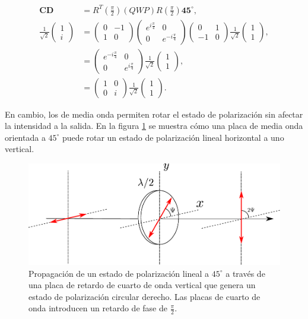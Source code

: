 \begin{align*}
\mathbf{CD} &=
R^{T}\left(\frac{\pi}{2}\right)\left(QWP\right)R\left(\frac{\pi}{2}\right)\mathbf{45}^{\circ},\\ 
  \frac{1}{\sqrt{2}}
\begin{pmatrix}
1\\i
\end{pmatrix}&=
\begin{pmatrix}
  0 &-1\\1&0
\end{pmatrix}
\begin{pmatrix} e^{i\frac{\pi}{4}}  &0\\0&e^{-i\frac{\pi}{4}} \end{pmatrix}
\begin{pmatrix}
  0&1\\-1&0
\end{pmatrix}
 \frac{1}{\sqrt{2}}
\begin{pmatrix}
1\\ 1
\end{pmatrix},
\\
&=
\begin{pmatrix}
e^{-i\frac{\pi}{4}}  & 0 \\0 & e^{i\frac{\pi}{4}} 
\end{pmatrix}
  \frac{1}{\sqrt{2}}
\begin{pmatrix}
1\\ 1
\end{pmatrix},\\
&=
\begin{pmatrix}
1  & 0 \\0 & i
\end{pmatrix}
  \frac{1}{\sqrt{2}}
\begin{pmatrix}
1\\ 1
\end{pmatrix}.
\end{align*}

En cambio, los de media onda permiten rotar el estado de
polarización sin afectar la intensidad a la salida. En la
figura \ref{fig:hwp_retarder} se muestra cómo una placa de media onda
orientada a $45^{\circ}$ puede rotar un estado de polarización lineal
horizontal a uno vertical. 

\begin{figure}[h!]
\centering
\includegraphics[scale=.7]{HWP_retarder}
\caption{Propagación de un estado de polarización lineal a
  $45^{\circ}$ a través de una placa de retardo de cuarto de onda
  vertical que genera un estado de polarización circular derecho. Las
placas de cuarto de onda introducen un retardo de fase de
$\frac{\pi}{2}$.}
\label{fig:hwp_retarder}
\end{figure}

